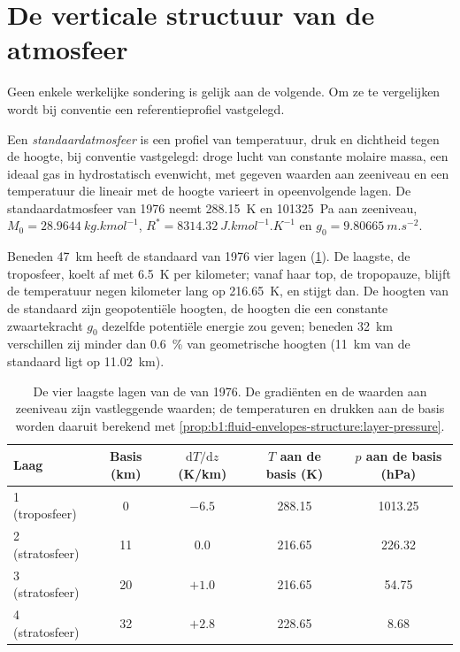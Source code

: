 \section{De verticale structuur van de atmosfeer}\label{sec:b1:fluid-envelopes-structure:atmosphere}

Geen enkele werkelijke sondering is gelijk aan de volgende. Om ze te vergelijken wordt bij conventie een referentieprofiel vastgelegd.

\begin{definition}[Standaardatmosfeer]\label{def:b1:fluid-envelopes-structure:standard-atmosphere}
Een \emph{standaardatmosfeer} is een profiel van temperatuur, druk en dichtheid tegen de hoogte, bij conventie vastgelegd: droge lucht van constante molaire massa, een ideaal gas in hydrostatisch evenwicht, met gegeven waarden aan zeeniveau en een temperatuur die lineair met de hoogte varieert in opeenvolgende lagen. De standaardatmosfeer van 1976 neemt \qty{288.15}{K} en \qty{101325}{Pa} aan zeeniveau, $M_0 = \qty{28.9644}{kg.kmol^{-1}}$, $R^* = \qty{8314.32}{J.kmol^{-1}.K^{-1}}$ en $g_0 = \qty{9.80665}{m.s^{-2}}$.
\end{definition}

Beneden \qty{47}{km} heeft de standaard van 1976 vier lagen (\cref{tab:b1:fluid-envelopes-structure:layers}). De laagste, de troposfeer, koelt af met \qty{6.5}{K} per kilometer; vanaf haar top, de tropopauze, blijft de temperatuur negen kilometer lang op \qty{216.65}{K}, en stijgt dan. De hoogten van de standaard zijn geopotentiële hoogten, de hoogten die een constante zwaartekracht $g_0$ dezelfde potentiële energie zou geven; beneden \qty{32}{km} verschillen zij minder dan \qty{0.6}{\percent} van geometrische hoogten (\qty{11}{km} van de standaard ligt op \qty{11.02}{km}).

\begin{table}[ht]
\centering
\small
\renewcommand{\arraystretch}{1.2}
\begin{tabular}{|l|c|c|c|c|}
\hline
Laag & Basis (km) & $\mathrm dT/\mathrm dz$ (K/km) & $T$ aan de basis (K) & $p$ aan de basis (hPa) \\
\hline
1 (troposfeer) & 0 & $-6.5$ & 288.15 & 1013.25 \\
2 (stratosfeer) & 11 & 0.0 & 216.65 & 226.32 \\
3 (stratosfeer) & 20 & $+1.0$ & 216.65 & 54.75 \\
4 (stratosfeer) & 32 & $+2.8$ & 228.65 & 8.68 \\
\hline
\end{tabular}
\caption{De vier laagste lagen van de  van 1976. De gradiënten en de waarden aan zeeniveau zijn vastleggende waarden; de temperaturen en drukken aan de basis worden daaruit berekend met \cref{prop:b1:fluid-envelopes-structure:layer-pressure}.}
\label{tab:b1:fluid-envelopes-structure:layers}
\end{table}

